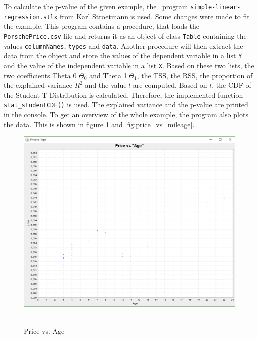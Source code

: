 	To calculate the p-value of the given example, the \setlx\ program \href{https://raw.githubusercontent.com/karlstroetmann/Artificial-Intelligence/master/SetlX/simple-linear-regression.stlx}{\lstinline{simple-linear-regression.stlx}} from Karl Stroetmann is used. Some changes were made to fit the example. This program contains a procedure, that loads the \lstinline{PorschePrice.csv} file and returns it as an object of class \lstinline{Table} containing the values \lstinline{columnNames}, \lstinline{types} and \lstinline{data}. Another procedure will then extract the data from the object and store the values of the dependent variable in a list \lstinline{Y} and the value of the independent variable in a list \lstinline{X}. Based on these two lists, the two coefficients Theta 0 $\Theta _0$ and Theta 1 $\Theta _1$, the \ac{TSS}, the \ac{RSS}, the proportion of the explained variance $R^{2}$ and the value $t$ are computed. Based on $t$, the \ac{CDF} of the Student-T Distribution is calculated. Therefore, the implemented function \lstinline{stat_studentCDF()} is used. The explained variance and the p-value are printed in the console. To get an overview of the whole example, the program also plots the data. This is shown in figure \ref{fig:price_vs_age} and \ref{fig:price_vs_mileage}.

	\begin{figure}[h]
		\centering
		\includegraphics[width=1\textwidth]{Figures/price_vs_age}~\\
		\caption{Price vs. Age}
		\label{fig:price_vs_age}
	\end{figure}


